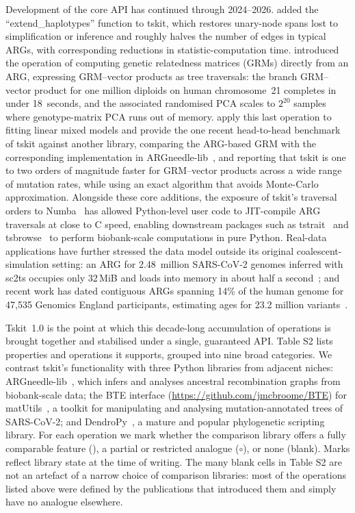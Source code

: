 \documentclass{article}
\begin{document}
Development of the core API has continued through
2024--2026. \citet{fritze2026forest} added the
``extend\_haplotypes'' function to tskit, which restores
unary-node spans lost to simplification or inference and roughly
halves the number of edges in typical ARGs, with corresponding
reductions in statistic-computation time.
\citet{lehmann2026on}
introduced the operation of computing genetic relatedness matrices
(GRMs) directly from an ARG, expressing GRM--vector products as
tree traversals: the branch GRM--vector product for
one million diploids on human chromosome~21 completes in
under 18~seconds, and the associated randomised PCA scales to
$2^{20}$ samples where genotype-matrix PCA runs out of memory.
\citet{lee2026genetic} apply this
last operation to fitting linear mixed models and provide the one recent
head-to-head benchmark of tskit against another library,
comparing the ARG-based GRM with the corresponding implementation
in ARGneedle-lib~\citep{zhang2023biobank},
and reporting that tskit is one to two orders of
magnitude faster for GRM--vector products across a wide range of
mutation rates,
while using an exact algorithm that avoids Monte-Carlo approximation.
Alongside these core additions, the exposure of tskit's
traversal orders to Numba~\citep{lam2015numba} has allowed
Python-level user code to JIT-compile ARG traversals at close to C
speed, enabling downstream packages such as
tstrait~\citep{tagami2024tstrait} and tsbrowse~\citep{karthikeyan2025tsbrowse}
to perform biobank-scale computations in pure Python.
Real-data applications have further stressed the data model
outside its original coalescent-simulation setting: an ARG for
2.48~million SARS-CoV-2 genomes inferred with sc2ts occupies only
32\,MiB and loads into memory in about half a
second~\citep{zhan2025pandemic}; and recent work has dated
contiguous ARGs spanning 14\% of the human genome for 47,535
Genomics England participants, estimating ages for 23.2 million
variants~\citep{pope2026tracing}.

Tskit~1.0 is the point at which this
decade-long accumulation of operations is brought together and
stabilised under a single, guaranteed API.
Table S2 lists properties and operations it supports, grouped
into nine broad categories.
We contrast tskit's functionality with three
Python libraries from adjacent niches:
ARGneedle-lib~\citep{zhang2023biobank}, which infers and analyses
ancestral recombination graphs from biobank-scale data;
the BTE interface (\url{https://github.com/jmcbroome/BTE})
for matUtils~\citep{mcbroome2021daily},
a toolkit for manipulating and analysing mutation-annotated trees
of SARS-CoV-2; and DendroPy~\citep{sukumaran2010dendropy}, a
mature and popular phylogenetic scripting library.
For each operation we mark whether the comparison library offers a
fully comparable feature (\checkmark), a partial or restricted
analogue ($\circ$), or none (blank). Marks reflect library state
at the time of writing.
The many blank cells
in Table S2 are not an artefact of a narrow choice of comparison
libraries: most of the operations listed above were defined by the
publications that introduced them and simply have no analogue
elsewhere.




\end{document}
